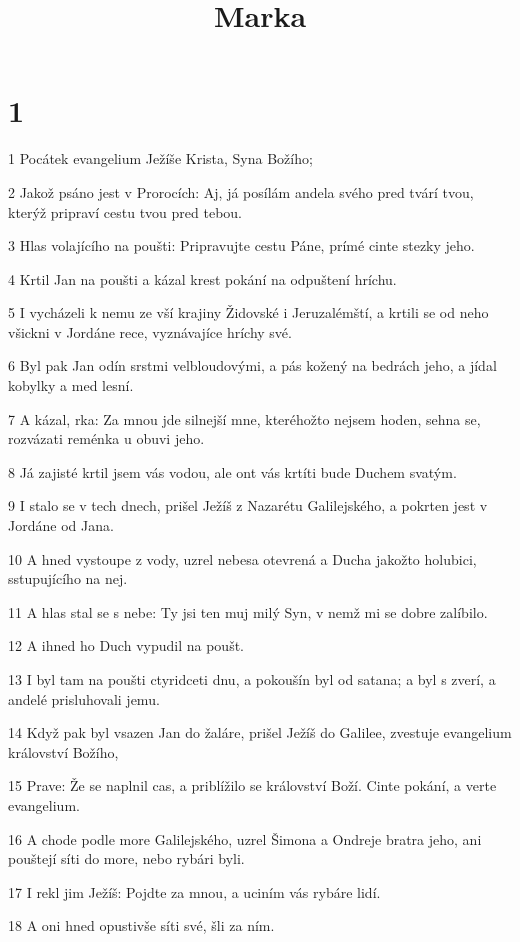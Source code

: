 

\title{Marka}

\chapter{1}

\par 1 Pocátek evangelium Ježíše Krista, Syna Božího;
\par 2 Jakož psáno jest v Prorocích: Aj, já posílám andela svého pred tvárí tvou, kterýž pripraví cestu tvou pred tebou.
\par 3 Hlas volajícího na poušti: Pripravujte cestu Páne, prímé cinte stezky jeho.
\par 4 Krtil Jan na poušti a kázal krest pokání na odpuštení hríchu.
\par 5 I vycházeli k nemu ze vší krajiny Židovské i Jeruzalémští, a krtili se od neho všickni v Jordáne rece, vyznávajíce hríchy své.
\par 6 Byl pak Jan odín srstmi velbloudovými, a pás kožený na bedrách jeho, a jídal kobylky a med lesní.
\par 7 A kázal, rka: Za mnou jde silnejší mne, kteréhožto nejsem hoden, sehna se, rozvázati reménka u obuvi jeho.
\par 8 Já zajisté krtil jsem vás vodou, ale ont vás krtíti bude Duchem svatým.
\par 9 I stalo se v tech dnech, prišel Ježíš z Nazarétu Galilejského, a pokrten jest v Jordáne od Jana.
\par 10 A hned vystoupe z vody, uzrel nebesa otevrená a Ducha jakožto holubici, sstupujícího na nej.
\par 11 A hlas stal se s nebe: Ty jsi ten muj milý Syn, v nemž mi se dobre zalíbilo.
\par 12 A ihned ho Duch vypudil na poušt.
\par 13 I byl tam na poušti ctyridceti dnu, a pokoušín byl od satana; a byl s zverí, a andelé prisluhovali jemu.
\par 14 Když pak byl vsazen Jan do žaláre, prišel Ježíš do Galilee, zvestuje evangelium království Božího,
\par 15 Prave: Že se naplnil cas, a priblížilo se království Boží. Cinte pokání, a verte evangelium.
\par 16 A chode podle more Galilejského, uzrel Šimona a Ondreje bratra jeho, ani pouštejí síti do more, nebo rybári byli.
\par 17 I rekl jim Ježíš: Pojdte za mnou, a uciním vás rybáre lidí.
\par 18 A oni hned opustivše síti své, šli za ním.
